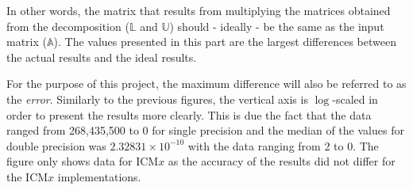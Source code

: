 In other words, the matrix that results from multiplying the matrices obtained from the decomposition ($ \mathbb{L} $ and $ \mathbb{U} $) should - ideally - be the same as the input matrix ($ \mathbb{A} $). The values presented in this part are the largest differences between the actual results and the ideal results.
\par For the purpose of this project, the maximum difference will also be referred to as the \textit{error}. Similarly to the previous figures, the vertical axis is $ \log $-scaled in order to present the results more clearly. This is due the fact that the data ranged from 268,435,500 to 0 for single precision and the median of the values for double precision was $ 2.32831\times10^{-10} $ with the data ranging from 2 to 0. The figure only shows data for ICM$ x $ as the accuracy of the results did not differ for the ICM$ x $ implementations.

